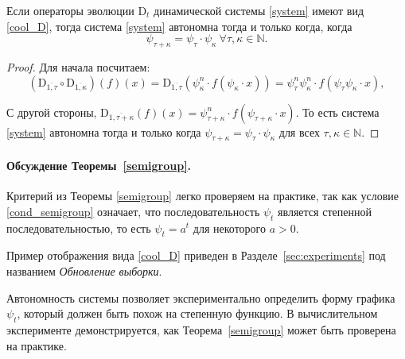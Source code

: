         \begin{theorem} \label{semigroup}
            Если операторы эволюции $\text{D}_t$ динамической системы \eqref{system} имеют вид \eqref{cool_D}, тогда система \eqref{system} автономна тогда и только когда, когда
            \begin{equation} \label{cond_semigroup}
                \psi_{\tau + \kappa} = \psi_{\tau} \cdot \psi_{\kappa} ~\forall \tau, \kappa \in \mathbb{N}.
            \end{equation}
        \end{theorem}

        \begin{proof}
            Для начала посчитаем:
            \begin{equation*}
            (\text{D}_{\overline{1, \tau}} \circ \text{D}_{\overline{1, \kappa}})(f)(x) = \text{D}_{\overline{1, \tau}}(\psi_{\kappa}^n \cdot f(\psi_{\kappa} \cdot x)) = \psi_{\tau}^n\psi_{\kappa}^n \cdot f(\psi_{\tau}\psi_{\kappa} \cdot x),
            \end{equation*}

            С другой стороны,
            $
                \text{D}_{\overline{1, \tau + \kappa}}(f)(x) = \psi_{\tau + \kappa}^n \cdot f(\psi_{\tau + \kappa} \cdot x).
            $
            То есть система \eqref{system} автономна тогда и только когда $\psi_{\tau + \kappa} = \psi_{\tau} \cdot \psi_{\kappa}$ для всех $ \tau, \kappa \in \mathbb{N}$.
        \end{proof}
    
        \paragraph{Обсуждение Теоремы~\ref{semigroup}.} Критерий из Теоремы \ref{semigroup} легко проверяем на практике, так как условие \eqref{cond_semigroup} означает, что последовательность $\psi_t$ является степенной последовательностью, то есть $\psi_t = a^t$ для некоторого $a > 0$. 
    
        Пример отображения вида \eqref{cool_D} приведен в Разделе~\ref{sec:experiments} под названием \emph{Обновление выборки}.
    
        Автономность системы позволяет экспериментально определить форму графика $\psi_t$, который должен быть похож на степенную функцию. В вычислительном эксперименте демонстрируется, как Теорема~\ref{semigroup} может быть проверена на практике.
    
